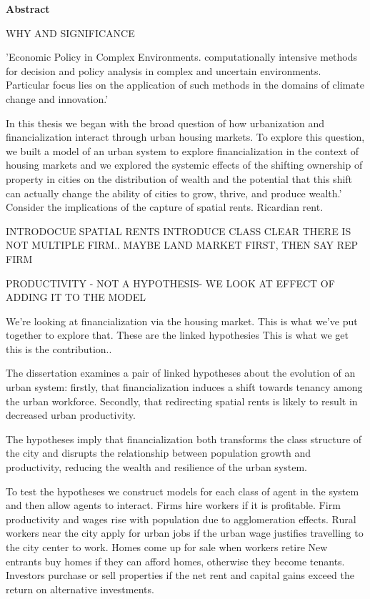 \begin{center}\textbf{Abstract}\end{center}

WHY AND SIGNIFICANCE

'Economic Policy in Complex Environments. computationally intensive methods for decision and policy analysis in complex and uncertain environments. Particular focus lies on the application of such methods in the domains of climate change and innovation.'

In this thesis we began with the broad question of how urbanization and financialization interact through urban housing markets.
To explore this question, we built a model of an urban system to explore financialization in the context of housing markets and we explored the systemic effects of the shifting ownership of property in cities on the distribution of wealth and the potential that this shift can actually change the ability of cities to grow, thrive, and produce wealth.' 
Consider the implications of the capture of spatial rents. 
Ricardian rent.


INTRODOCUE SPATIAL RENTS
INTRODUCE CLASS
CLEAR THERE IS NOT MULTIPLE FIRM.. MAYBE LAND MARKET FIRST, THEN SAY REP FIRM

PRODUCTIVITY - NOT A HYPOTHESIS- WE LOOK AT EFFECT OF ADDING IT TO THE MODEL


We're looking at financialization  via the housing market. 
This is what we've put together to explore that.
These are the linked hypothesies
This is what we get
this is the contribution..


The dissertation examines a pair of linked hypotheses about the evolution of an urban system: firstly, that financialization induces a shift towards tenancy among the urban workforce.  Secondly, that redirecting spatial rents is likely to result in decreased urban productivity. 

The hypotheses imply that financialization both transforms the class structure of the city and disrupts the relationship between population growth and productivity, reducing the wealth and resilience of the urban system. 


To test the hypotheses we construct models for each class of agent in the system and then allow agents to interact. Firms hire workers if it is profitable. Firm productivity and wages rise with population due to agglomeration effects. Rural workers near the city apply for urban jobs if the urban wage justifies travelling to the city center to work. Homes come up for sale when workers retire New entrants buy homes if they can afford homes, otherwise they become tenants. Investors purchase or sell properties if the net rent and capital gains exceed the return on alternative investments. %

